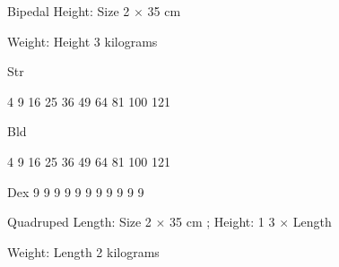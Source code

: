 \documentclass[twoside]{book}
\begin{document}
                  
                   Bipedal   
                    Height:     
                         Size  2 
                             \ensuremath{\times}  35  cm
                               
                    
                  
                  
                    
                     Weight:     
                     Height  3    kilograms
                         
                    
                  
                  
                   Str   
                  
                    
                    
                   4   
                   9   
                   16   
                   25   
                   36   
                   49   
                   64   
                   81   
                   100   
                   121   
                  
                  
                   Bld   
                  
                    
                    
                   4   
                   9   
                   16   
                   25   
                   36   
                   49   
                   64   
                   81   
                   100   
                   121   
                  
                  
                   Dex   
                   9   
                   9   
                   9   
                   9   
                   9   
                   9   
                   9   
                   9   
                   9   
                   9   
                   9   
                  
                  
                   Quadruped   
                    Length:   
                         Size  2 
                             \ensuremath{\times}    35 
                           cm    ; Height:  
                            1  3   
                           \ensuremath{\times}    Length   
                    
                  
                  
                    
                      Weight:     
                     Length  2    kilograms
                         
\end{document}
